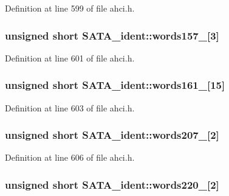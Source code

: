 Definition at line 599 of file ahci.\+h.

\subsubsection[{\texorpdfstring{words157\+\_\+159}{words157_159}}]{\setlength{\rightskip}{0pt plus 5cm}unsigned short S\+A\+T\+A\+\_\+ident\+::words157\+\_\mbox{[}3\mbox{]}}\hypertarget{structSATA__ident_a0ee80af77570613f9ba08c1bd30a90d5}{}\label{structSATA__ident_a0ee80af77570613f9ba08c1bd30a90d5}


Definition at line 601 of file ahci.\+h.

\subsubsection[{\texorpdfstring{words161\+\_\+175}{words161_175}}]{\setlength{\rightskip}{0pt plus 5cm}unsigned short S\+A\+T\+A\+\_\+ident\+::words161\+\_\mbox{[}15\mbox{]}}\hypertarget{structSATA__ident_a876fd52ee84beddb2b5e9a1a99ce098e}{}\label{structSATA__ident_a876fd52ee84beddb2b5e9a1a99ce098e}


Definition at line 603 of file ahci.\+h.

\subsubsection[{\texorpdfstring{words207\+\_\+208}{words207_208}}]{\setlength{\rightskip}{0pt plus 5cm}unsigned short S\+A\+T\+A\+\_\+ident\+::words207\+\_\mbox{[}2\mbox{]}}\hypertarget{structSATA__ident_a6d22ea8ccce917853c3558482d51c2ad}{}\label{structSATA__ident_a6d22ea8ccce917853c3558482d51c2ad}


Definition at line 606 of file ahci.\+h.

\subsubsection[{\texorpdfstring{words220\+\_\+221}{words220_221}}]{\setlength{\rightskip}{0pt plus 5cm}unsigned short S\+A\+T\+A\+\_\+ident\+::words220\+\_\mbox{[}2\mbox{]}}\hypertarget{structSATA__ident_aa7710925f1b4b459e6499ce2d3e82408}{}\label{structSATA__ident_aa7710925f1b4b459e6499ce2d3e82408}


